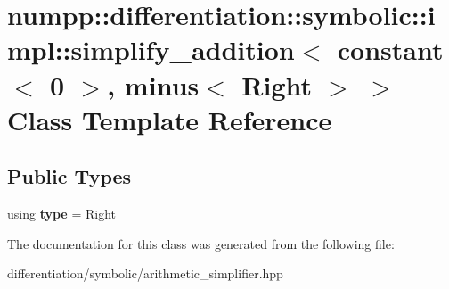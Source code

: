 \hypertarget{classnumpp_1_1differentiation_1_1symbolic_1_1impl_1_1simplify__addition_3_01constant_3_010_01_4_00_01minus_3_01Right_01_4_01_4}{}\section{numpp\+:\+:differentiation\+:\+:symbolic\+:\+:impl\+:\+:simplify\+\_\+addition$<$ constant$<$ 0 $>$, minus$<$ Right $>$ $>$ Class Template Reference}
\label{classnumpp_1_1differentiation_1_1symbolic_1_1impl_1_1simplify__addition_3_01constant_3_010_01_4_00_01minus_3_01Right_01_4_01_4}
\subsection*{Public Types}
\begin{DoxyCompactItemize}
\item 
\mbox{\label{classnumpp_1_1differentiation_1_1symbolic_1_1impl_1_1simplify__addition_3_01constant_3_010_01_4_00_01minus_3_01Right_01_4_01_4_a8cd9078b769898af28db0568b8660fa6}} 
using {\bfseries type} = Right
\end{DoxyCompactItemize}


The documentation for this class was generated from the following file\+:\begin{DoxyCompactItemize}
\item 
differentiation/symbolic/arithmetic\+\_\+simplifier.\+hpp\end{DoxyCompactItemize}
